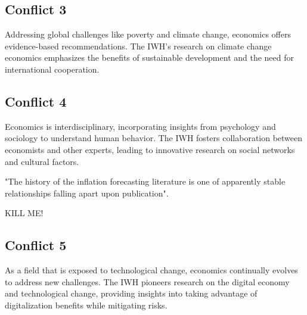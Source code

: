 \documentclass{article}
\begin{document}
\subsection{Conflict 3}
Addressing global challenges like poverty and climate change, economics offers evidence-based recommendations. The IWH's research on climate change economics emphasizes the benefits of sustainable development and the need for international cooperation.

\subsection{Conflict 4}
Economics is interdisciplinary, incorporating insights from psychology and sociology to understand human behavior. The IWH fosters collaboration between economists and other experts, leading to innovative research on social networks and cultural factors.

"The history of the inflation forecasting literature is one of apparently stable relationships falling apart upon publication".

KILL ME!

\subsection{Conflict 5}
As a field that is exposed to technological change, economics continually evolves to address new challenges. The IWH pioneers research on the digital economy and technological change, providing insights into taking advantage of digitalization benefits while mitigating risks.
\end{document}
